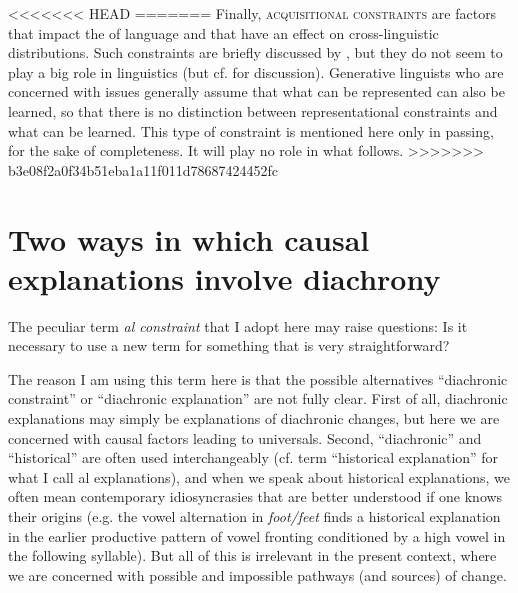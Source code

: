 \documentclass[output=paper]{langsci/langscibook}
\begin{document}
<<<<<<< HEAD
=======
\largerpage
Finally, \textsc{acquisitional constraints} are factors that impact the  of language and that have an effect on cross-linguistic distributions. Such constraints are briefly discussed by \citet{Anderson2016}, but they do not seem to play a big role in linguistics (but cf.  for discussion). Generative linguists who are concerned with  issues generally assume that what can be represented can also be learned, so that there is no distinction between representational constraints and what can be learned. This type of constraint is mentioned here only in passing, for the sake of completeness. It will play no role in what follows.
>>>>>>> b3e08f2a0f34b51eba1a11f011d78687424452fc

\section{Two ways in which causal explanations involve diachrony}\label{sec:haspelmath:3}

The peculiar term \textit{al constraint} that I adopt here may raise questions: Is it necessary to use a new term for something that is very straightforward? 

The reason I am using this term here is that the possible alternatives “diachronic constraint” or “diachronic explanation” are not fully clear. First of all, diachronic explanations may simply be explanations of diachronic changes, but here we are concerned with causal factors leading to universals. Second, “diachronic” and “historical” are often used interchangeably (cf.  term “historical explanation” for what I call al explanations), and when we speak about historical explanations, we often mean contemporary idiosyncrasies that are better understood if one knows their origins (e.g. the vowel alternation in \textit{foot/feet} finds a historical explanation in the earlier productive pattern of vowel fronting conditioned by a high vowel in the following syllable). But all of this is irrelevant in the present context, where we are concerned with possible and impossible pathways (and sources) of change.
\end{document}
